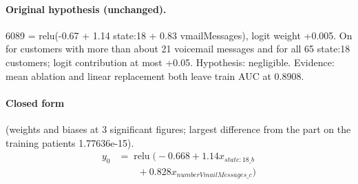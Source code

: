 \documentclass[a4paper,10pt]{article}
\newif\ifreviewmarks
\newcommand{\reviewrule}{\noindent{\color{BrickRed}\rule{\linewidth}{0.8pt}}}
\newenvironment{drafted}[1][]{%
  \ifreviewmarks\par\addvspace{\medskipamount}\reviewrule\par\nopagebreak
  \noindent{\color{BrickRed}\sffamily\footnotesize\textbf{Thesis Draft}\quad #1\hfill review}\par\nopagebreak\smallskip\fi}{%
  \ifreviewmarks\par\smallskip\noindent{\color{BrickRed}\sffamily\footnotesize end of thesis draft}\par\nopagebreak\reviewrule\par\medskip\fi}
\begin{document}
\begin{drafted}[plain-language layer: churn100-s4-c2]
\paragraph{Original hypothesis (unchanged).} 6089 = relu(-0.67 + 1.14 state:18 + 0.83 vmailMessages), logit weight +0.005. On for customers with more than about 21 voicemail messages and for all 65 state:18 customers; logit contribution at most +0.05. Hypothesis: negligible. Evidence: mean ablation and linear replacement both leave train AUC at 0.8908.
\paragraph{Closed form} {\footnotesize(weights and biases at 3 significant figures; largest difference from the part on the training patients 1.77636e-15).}
{\small\begingroup\allowdisplaybreaks
\begin{align*}
y_{0} &= \operatorname{relu}\bigl(-0.668 + 1.14 x_{state:18\_b} \\
&\qquad + 0.828 x_{numberVmailMessages\_c}\bigr)
\end{align*}\endgroup}


\end{drafted}
\end{document}
